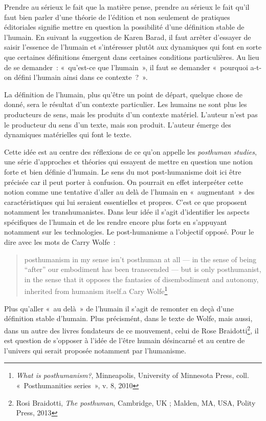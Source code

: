 Prendre au sérieux le fait que la matière pense, prendre au sérieux le
fait qu'il faut bien parler d'une théorie de l'édition et non seulement
de pratiques éditoriales signifie mettre en question la possibilité
d'une définition stable de l'humain. En suivant la suggestion de Karen
Barad, il faut arrêter d'essayer de saisir l'essence de l'humain et
s'intéresser plutôt aux dynamiques qui font en sorte que certaines
définitions émergent dans certaines conditions particulières. Au lieu de
se demander~: «~qu'est-ce que l'humain~», il faut se demander «~pourquoi
a-t-on défini l'humain ainsi dans ce contexte~?~».

La définition de l'humain, plus qu'être un point de départ, quelque
chose de donné, sera le résultat d'un contexte particulier. Les humains
ne sont plus les producteurs de sens, mais les produits d'un contexte
matériel. L'auteur n'est pas le producteur du sens d'un texte, mais son
produit. L'auteur émerge des dynamiques matérielles qui font le texte.

Cette idée est au centre des réflexions de ce qu'on appelle les
\emph{posthuman studies}, une série d'approches et théories qui essayent
de mettre en question une notion forte et bien définie d'humain. Le sens
du mot post-humanisme doit ici être précisée car il peut porter à
confusion. On pourrait en effet interpréter cette notion comme une
tentative d'aller au delà de l'humain en «~augmentant~» des
caractéristiques qui lui seraient essentielles et propres. C'est ce que
proposent notamment les transhumanistes. Dans leur idée il s'agit
d'identifier les aspects spécifiques de l'humain et de les rendre encore
plus forts en s'appuyant notamment sur les technologies. Le
post-humanisme a l'objectif opposé. Pour le dire avec les mots de Carry
Wolfe~:

\begin{quote}
posthumanism in my sense isn't posthuman at all --- in the sense of
being ``after'' our embodiment has been transcended --- but is only
posthumanist, in the sense that it opposes the fantasies of
disembodiment and autonomy, inherited from humanism itself.a Cary
Wolfe\footnote{\emph{What is posthumanism?}, Minneapolis, University of
  Minnesota Press, coll. «~Posthumanities series~», v. 8, 2010}
\end{quote}

Plus qu'aller «~au delà~» de l'humain il s'agit de remonter en deçà
d'une définition stable d'humain. Plus précismént, dans le texte de
Wolfe, mais aussi, dans un autre des livres fondateurs de ce mouvement,
celui de Rose Braidotti\footnote{Rosi Braidotti, \emph{The posthuman},
  Cambridge, UK ; Malden, MA, USA, Polity Press, 2013}, il est question
de s'opposer à l'idée de l'être humain désincarné et au centre de
l'univers qui serait proposée notamment par l'humanisme.

